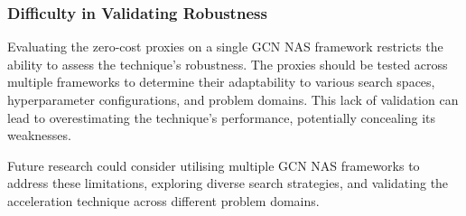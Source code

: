 \begin{comment}
Fra MAX:
Jeg tenker at dette ikke har så voldsomt mye med zero-cost proxies som er hovedpoenget med denne thesisen. Har derfor valgt å fjerne den foreløpig. 

\subsubsection{Restricted Exploration of NAS Techniques}
Focusing on a single framework limits exploring various NAS techniques for GCN. Employing multiple GCN NAS frameworks would enable the investigation of different search strategies, optimisation methods, and search space configurations, which could lead to a deeper understanding of the factors that influence the efficiency and effectiveness of the NAS acceleration technique.
\end{comment}


    
\subsubsection{Difficulty in Validating Robustness}

Evaluating the zero-cost proxies on a single GCN NAS framework restricts the ability to assess the technique's robustness. The proxies should be tested across multiple frameworks to determine their adaptability to various search spaces, hyperparameter configurations, and problem domains. This lack of validation can lead to overestimating the technique's performance, potentially concealing its weaknesses.

Future research could consider utilising multiple GCN NAS frameworks to address these limitations, exploring diverse search strategies, and validating the acceleration technique across different problem domains. 
